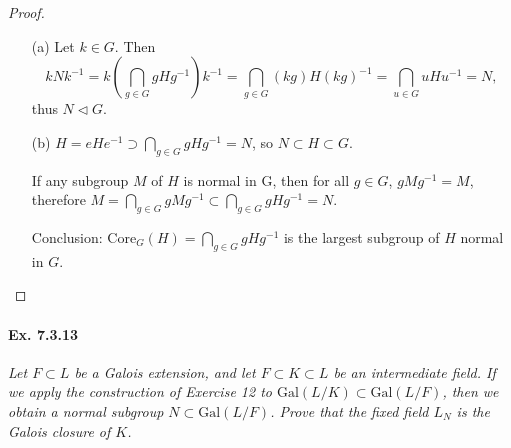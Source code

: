 \documentclass[11pt,a4paper]{article}
\newcommand{\Gal}{\mathrm{Gal}}
\begin{document}
\begin{proof}
\begin{enumerate}
\item[(a)]
Let $k \in G$. Then
$$kNk^{-1} = k \left(\bigcap\limits_{g\in G}gHg^{-1}\right)k^{-1} = \bigcap\limits_{g\in G}(kg)H(kg)^{-1} = \bigcap\limits_{u\in G}uHu^{-1} = N,$$
thus $N \lhd G$.

\item[(b)]
$H = eHe^{-1} \supset \bigcap\limits_{g\in G}gHg^{-1}=N$, so $ N \subset H \subset G$.

If any subgroup $M$ of $H$ is normal in G, then for all $g\in G$, $gMg^{-1} = M$, therefore $M = \bigcap\limits_{g\in G}gMg^{-1} \subset \bigcap\limits_{g\in G}gHg^{-1}=N$.

Conclusion:  $\mathrm{Core}_G(H) = \bigcap\limits_{g\in G}gHg^{-1}$ is the largest subgroup of $H$ normal in $G$.
\end{enumerate}
\end{proof}

\paragraph{Ex. 7.3.13}

{\it Let $F \subset L$ be a Galois extension, and let $F\subset K \subset L$ be an intermediate field. If we apply the construction of Exercise 12 to $\Gal(L/K) \subset \Gal(L/F)$, then we obtain a normal subgroup $N \subset \Gal(L/F)$. Prove that the fixed field $L_N$ is the Galois closure of $K$.
}
\end{document}
